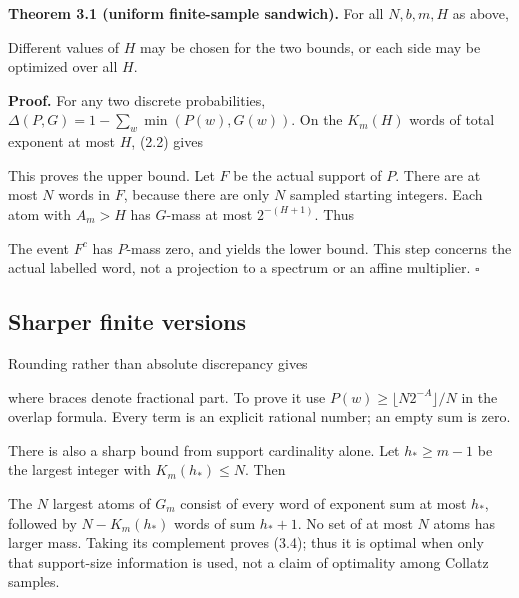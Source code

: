 \textbf{Theorem 3.1 (uniform finite-sample sandwich).} For all
\(N,b,m,H\) as above,


Different values of \(H\) may be chosen for the two bounds, or each side
may be optimized over all \(H\).

\textbf{Proof.} For any two discrete probabilities,
\(\Delta(P,G)=1-\sum_w\min(P(w),G(w))\). On the \(K_m(H)\) words of
total exponent at most \(H\), (2.2) gives


This proves the upper bound. Let \(F\) be the actual support of \(P\).
There are at most \(N\) words in \(F\), because there are only \(N\)
sampled starting integers. Each atom with \(A_m>H\) has \(G\)-mass at
most \(2^{-(H+1)}\). Thus


The event \(F^c\) has \(P\)-mass zero, and yields the lower bound. This
step concerns the actual labelled word, not a projection to a spectrum
or an affine multiplier. \(\square\)

\subsection{Sharper finite versions}

Rounding rather than absolute discrepancy gives


where braces denote fractional part. To prove it use
\(P(w)\ge\lfloor N2^{-A}\rfloor/N\) in the overlap formula. Every term
is an explicit rational number; an empty sum is zero.

There is also a sharp bound from support cardinality alone. Let
\(h_*\ge m-1\) be the largest integer with \(K_m(h_*)\le N\). Then


The \(N\) largest atoms of \(G_m\) consist of every word of exponent sum
at most \(h_*\), followed by \(N-K_m(h_*)\) words of sum \(h_*+1\). No
set of at most \(N\) atoms has larger mass. Taking its complement proves
(3.4); thus it is optimal when only that support-size information is
used, not a claim of optimality among Collatz samples.

